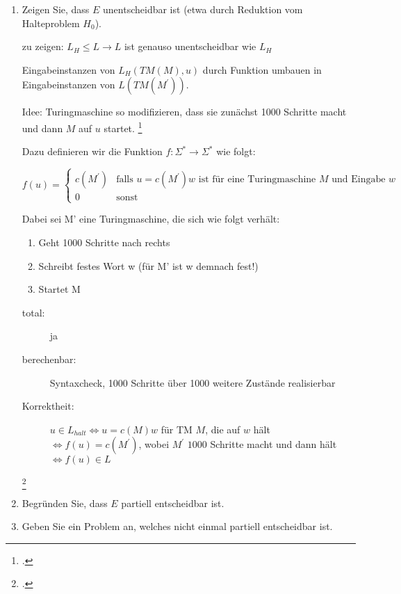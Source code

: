 \documentclass{bschlangaul-aufgabe}
\begin{document}
\begin{enumerate}


\item Zeigen Sie, dass $E$ unentscheidbar ist (etwa durch Reduktion vom
Halteproblem $H_0$).

\begin{bAntwort}
zu zeigen: $L_H \leq L \rightarrow L$ ist genauso unentscheidbar wie $L_H$

Eingabeinstanzen von $L_H (TM(M), u)$ durch Funktion umbauen in
Eingabeinstanzen von $L (TM (M^\prime))$.

Idee: Turingmaschine so modifizieren, dass sie zunächst
1000 Schritte macht und dann $M$ auf $u$ startet.
\footcite[Seite 53]{theo:fs:4}

Dazu definieren wir die Funktion $f : \Sigma^* \rightarrow \Sigma^*$ wie
folgt:

\begin{equation*}
f(u) =
\begin{cases}
c(M^\prime) &
\text{falls }u = c(M^\prime)w\text{ ist für eine Turingmaschine }M\text{ und Eingabe }w\\

0 & \text{sonst}
\end{cases}
\end{equation*}

Dabei sei M’ eine Turingmaschine, die sich wie folgt verhält:
\begin{enumerate}
\item Geht 1000 Schritte nach rechts
\item Schreibt festes Wort w (für M’ ist w demnach fest!)
\item Startet M
\end{enumerate}

\begin{description}
\item [total:]

ja

\item [berechenbar:]

Syntaxcheck, 1000 Schritte über 1000 weitere Zustände realisierbar

\item [Korrektheit:]

$u \in L_{halt} \Leftrightarrow u = c(M)w$ für TM $M$, die auf $w$ hält
$\Leftrightarrow f(u) = c(M^\prime)$, wobei $M^\prime$ $1000$ Schritte
macht und dann hält $\Leftrightarrow f(u) \in L$
\end{description}
\end{bAntwort}
\footcite[Seite 54]{theo:fs:4}


\item Begründen Sie, dass $E$ partiell entscheidbar ist.


\item Geben Sie ein Problem an, welches nicht einmal partiell
entscheidbar ist.

\end{enumerate}
\end{document}
